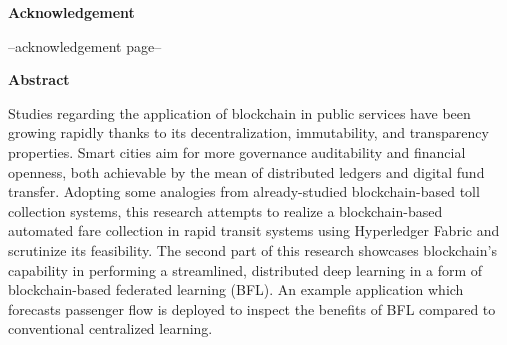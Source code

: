 \documentclass[a4paper,12pt,oneside, utf8x]{report}
\begin{document}
\linespread{1.6}\selectfont

\begin{titlepage}
\pagestyle{empty}
    \hfill \break \hfill \break
    {{\huge \centering \textbf{Acknowledgement}\par}
    \hfill \break \hfill \break
    --acknowledgement page--

    }
\end{titlepage}

\begin{titlepage}

\pagestyle{empty}
    \hfill \break \hfill \break
    {{\huge \centering \textbf{Abstract}\par}
    \hfill \break 
    Studies regarding the application of blockchain in public services have been growing rapidly thanks to its decentralization, immutability, and transparency properties. Smart cities aim for more governance auditability and financial openness, both achievable by the mean of distributed ledgers and digital fund transfer. Adopting some analogies from already-studied blockchain-based toll collection systems, this research attempts to realize a blockchain-based automated fare collection in rapid transit systems using Hyperledger Fabric and scrutinize its feasibility. The second part of this research showcases blockchain's capability in performing a streamlined, distributed deep learning in a form of blockchain-based federated learning (BFL). An example application which forecasts passenger flow is deployed to inspect the benefits of BFL compared to conventional centralized learning.

    }
\end{titlepage}

\setlength{\cftbeforetoctitleskip}{-4em}
\setlength{\cftaftertoctitleskip}{-1.3em}
\setlength{\cftbeforeloftitleskip}{-4em}
\setlength{\cftafterloftitleskip}{-1.3em}
\setlength{\cftbeforelottitleskip}{-4em}
\setlength{\cftafterlottitleskip}{-1.3em}


\renewcommand{\contentsname}{\hfill Table of Contents \hfill}
\renewcommand{\cftaftertoctitle}{\hfill}
\tableofcontents
\newpage
\renewcommand{\listfigurename}{\hfill List of Figures \hfill}
\listoffigures
\newpage
\renewcommand{\listtablename}{\hfill List of Tables \hfill}
\listoftables
\end{document}
